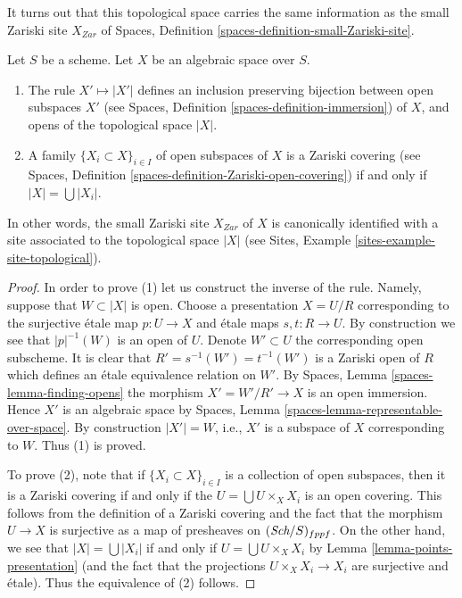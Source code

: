\noindent
It turns out that this topological space carries the same information
as the small Zariski site $X_{Zar}$ of
Spaces, Definition \ref{spaces-definition-small-Zariski-site}.

\begin{lemma}
\label{lemma-open-subspaces}
Let $S$ be a scheme.
Let $X$ be an algebraic space over $S$.
\begin{enumerate}
\item The rule $X' \mapsto |X'|$ defines an inclusion preserving
bijection between open subspaces $X'$ (see
Spaces, Definition \ref{spaces-definition-immersion})
of $X$, and opens of the topological space $|X|$.
\item A family $\{X_i \subset X\}_{i \in I}$ of open subspaces of $X$
is a Zariski covering (see
Spaces, Definition \ref{spaces-definition-Zariski-open-covering})
if and only if $|X| = \bigcup |X_i|$.
\end{enumerate}
In other words, the small Zariski site $X_{Zar}$ of $X$ is canonically
identified with a site associated to the topological space $|X|$ (see
Sites, Example \ref{sites-example-site-topological}).
\end{lemma}

\begin{proof}
In order to prove (1) let us construct the inverse of the rule.
Namely, suppose that $W \subset |X|$ is open. Choose a presentation
$X = U/R$ corresponding to the surjective \'etale map
$p : U \to X$ and \'etale maps $s, t : R \to U$.
By construction we see that $|p|^{-1}(W)$ is an
open of $U$. Denote $W' \subset U$ the corresponding open subscheme.
It is clear that $R' = s^{-1}(W') = t^{-1}(W')$ is a Zariski open
of $R$ which defines an \'etale equivalence relation on $W'$.
By Spaces, Lemma \ref{spaces-lemma-finding-opens} the morphism
$X' = W'/R' \to X$ is an open immersion. Hence $X'$ is an algebraic space
by Spaces, Lemma \ref{spaces-lemma-representable-over-space}.
By construction $|X'| = W$, i.e., $X'$ is a subspace of $X$
corresponding to $W$. Thus (1) is proved.

\medskip\noindent
To prove (2), note that if $\{X_i \subset X\}_{i \in I}$ is a collection
of open subspaces, then it is a Zariski covering if and only if the
$U = \bigcup U \times_X X_i$ is an open covering. This follows from
the definition of a Zariski covering and the fact that the morphism
$U \to X$ is surjective as a map of presheaves on $(\textit{Sch}/S)_{fppf}$.
On the other hand, we see that $|X| = \bigcup |X_i|$ if and only if
$U = \bigcup U \times_X X_i$ by Lemma \ref{lemma-points-presentation}
(and the fact that the projections $U \times_X X_i \to X_i$ are surjective
and \'etale). Thus the equivalence of (2) follows.
\end{proof}

